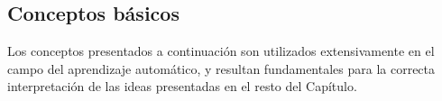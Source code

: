 %
%
\subsection{Conceptos básicos}
%
Los conceptos presentados a continuación son utilizados extensivamente
en el campo del aprendizaje automático, y resultan fundamentales para
la correcta interpretación de las ideas presentadas en el resto del
Capítulo.
